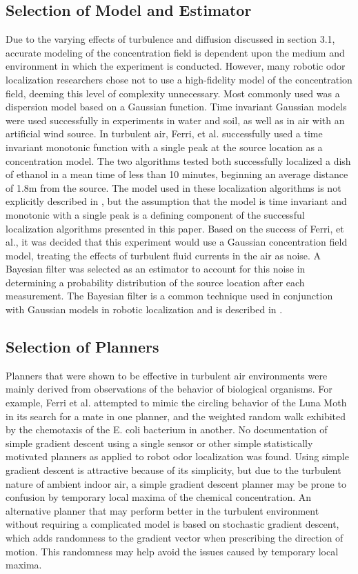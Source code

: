 \documentclass[submit, 12pt]{aiaa-pretty-modified}
\begin{document}
\subsection{Selection of Model and Estimator}
Due to the varying effects of turbulence and diffusion discussed in section 3.1,
accurate modeling of the concentration field is dependent upon the medium and
environment in which the experiment is conducted. However, many robotic odor
localization researchers chose not to use a high-fidelity model of the
concentration field, deeming this level of complexity unnecessary. \cite{kowadlo} Most
commonly used was a dispersion model based on a Gaussian function. Time
invariant Gaussian models were used successfully in experiments in water and
soil, as well as in air with an artificial wind source. \cite{kowadlo} In turbulent air,
Ferri, et al. successfully used a time invariant monotonic function with a
single peak at the source location as a concentration model. \cite{ferri} The two
algorithms tested both successfully localized a dish of ethanol in a mean time
of less than 10 minutes, beginning an average distance of 1.8m from the source.
The model used in these localization algorithms is not explicitly described in
\cite{ferri}, but the assumption that the model is time invariant and monotonic with a
single peak is a defining component of the successful localization algorithms
presented in this paper. Based on the success of Ferri, et al., it was decided
that this experiment would use a Gaussian concentration field model, treating
the effects of turbulent fluid currents in the air as noise. A Bayesian filter
was selected as an estimator to account for this noise in determining a
probability distribution of the source location after each measurement. The
Bayesian filter is a common technique used in conjunction with Gaussian models
in robotic localization and is described in \cite{bergman}.

\subsection{Selection of Planners}
Planners that were shown to be effective in turbulent air environments were
mainly derived from observations of the behavior of biological organisms.
\cite{ferri} For example, Ferri et al. attempted to mimic the circling behavior
of the Luna Moth in its search for a mate in one planner, and the weighted
random walk exhibited by the chemotaxis of the E. coli bacterium in another.
\cite{ferri} No documentation of simple gradient descent using a single sensor
or other simple statistically motivated planners as applied to robot odor
localization was found. Using simple gradient descent is attractive because of
its simplicity, but due to the turbulent nature of ambient indoor air, a simple
gradient descent planner may be prone to confusion by temporary local maxima of
the chemical concentration. An alternative planner that may perform better in
the turbulent environment without requiring a complicated model is based on
stochastic gradient descent, which adds randomness to the gradient vector when
prescribing the direction of motion. \cite{bottou} This randomness may
help avoid
the issues caused by temporary local maxima.
\end{document}
